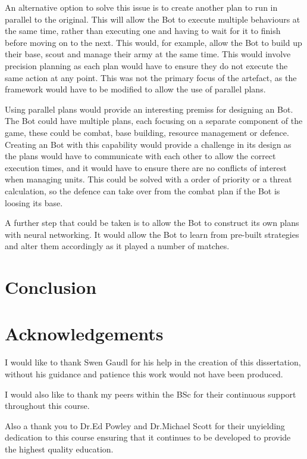 \documentclass[journal]{IEEEtran}
\begin{document}
An alternative option to solve this issue is to create another plan to run in parallel to the original. This will allow the Bot to execute multiple behaviours at the same time, rather than executing one and having to wait for it to finish before moving on to the next. This would, for example, allow the Bot to build up their base, scout and manage their army at the same time. This would involve precision planning as each plan would have to ensure they do not execute the same action at any point. This was not the primary focus of the artefact, as the framework would have to be modified to allow the use of parallel plans.

Using parallel plans would provide an interesting premiss for designing an Bot. The Bot could have multiple plans, each focusing on a separate component of the game, these could be combat, base building, resource management or defence. Creating an Bot with this capability would provide a challenge in its design as the plans would have to communicate with each other to allow the correct execution times, and it would have to ensure there are no conflicts of interest when managing units. This could be solved with a order of priority or a threat calculation, so the defence can take over from the combat plan if the Bot is loosing its base.

A further step that could be taken is to allow the Bot to construct its own plans with neural networking. It would allow the Bot to learn from pre-built strategies and alter them accordingly as it played a number of matches.

\section{Conclusion}
\section{Acknowledgements}
I would like to thank Swen Gaudl for his help in the creation of this dissertation, without his guidance and patience this work would not have been produced.

I would also like to thank my peers within the BSc for their continuous support throughout this course.

Also a thank you to Dr.Ed Powley and Dr.Michael Scott for their unyielding dedication to this course ensuring that it continues to be developed to provide the highest quality education.



\end{document}

